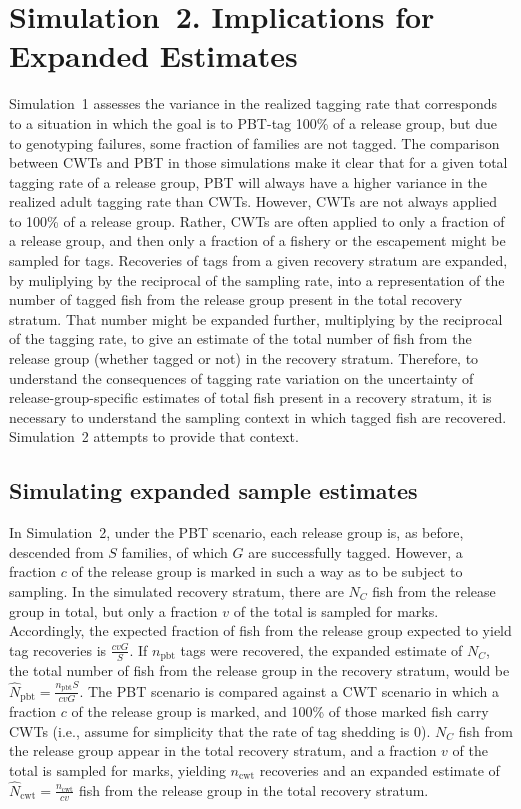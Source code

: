 \documentclass[11pt]{article}
\begin{document}
\section{Simulation~2. Implications for Expanded Estimates}

Simulation~1 assesses the variance in the realized tagging rate that corresponds to a situation in which
the goal is to PBT-tag 100\% of a release group, but due to genotyping failures, some fraction
of families are not tagged.  The comparison between CWTs and PBT in those simulations
make it clear that for a given total tagging rate of a release group, PBT will always have a higher
variance in the realized adult tagging rate than CWTs.  However, CWTs are not always applied to
100\% of a release group.  Rather, CWTs are often applied to only a fraction of a release group, and then
only a fraction of a fishery or the escapement might be sampled for tags.
Recoveries of tags from a given recovery stratum are expanded, by muliplying by the reciprocal of the
sampling rate, into a representation of the number of tagged fish from the release group present in the
total recovery stratum.  That number might be expanded further, multiplying by the reciprocal of the
tagging rate, to give an estimate of the total number of fish from the release group (whether
tagged or not) in the recovery stratum.  Therefore, to understand the consequences of tagging rate
variation on the uncertainty of release-group-specific estimates of total fish present in a recovery stratum, it is necessary to understand the 
sampling context in which tagged fish are recovered. Simulation~2 attempts to provide that context.  

\subsection{Simulating expanded sample estimates}

In Simulation~2, under the PBT scenario, each release group is, as before, descended from $S$ families, of which $G$ are successfully tagged.  However, a fraction
$c$ of the release group is marked in such a way as to be subject to sampling.  In the simulated recovery stratum, there are $N_C$ fish from
the release group in total, but only a fraction $v$ of the total is sampled for marks.  Accordingly, the expected fraction of fish 
from the release group expected to yield tag recoveries is $\frac{cvG}{S}$.   If $n_\mathrm{pbt}$ tags were recovered,
the expanded estimate of $N_C$, the
total number of fish from the release group in the recovery stratum, would be $\hat{N}_\mathrm{pbt} = \frac{n_\mathrm{pbt}S}{cvG}$.
The PBT scenario is compared against a CWT scenario in which a fraction $c$ of the release group is marked, and 100\% of those marked fish
carry CWTs (i.e., assume for simplicity that the rate of tag shedding is 0).  $N_C$ fish from the release group appear in the total recovery stratum,
and a fraction $v$ of the total is sampled for marks, yielding $n_\mathrm{cwt}$ recoveries and an expanded estimate of
$\hat{N}_\mathrm{cwt} = \frac{n_\mathrm{cwt}}{cv}$ fish from the release group in the total recovery stratum.  
\end{document}
